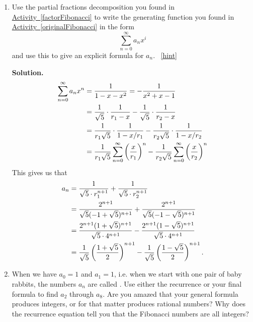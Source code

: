 \documentclass{book}
\begin{document}
\setcounter{project}{269}
\addtocounter{project}{-1}
\begin{activity}[]\label{solveFibonacci}
\leavevmode%
\begin{enumerate}[font=\bfseries,label=(\alph*),ref=\alph*]
\item\label{task-250} \hypertarget{p-1437}{}%
Use the partial fractions decomposition you found in \hyperref[factorFibonacci]{Activity~\ref{factorFibonacci}} to write the generating function you found in \hyperref[originalFibonacci]{Activity~\ref{originalFibonacci}} in the form%
\begin{equation*}
\sum_{n=0}^\infty a_nx^i
\end{equation*}
and use this to give an explicit formula for \(a_n\).%
~\hfill{\tiny\hyperlink{a-269.a}{[hint]}\hypertarget{q-269.a}{}}\par\smallskip%
\noindent\textbf{Solution.}\hypertarget{solution-206}{}\quad%
\hypertarget{p-1439}{}%
%
\begin{align*}
\sum_{n=0}^\infty a_nx^n  &= \frac{1}{1-x-x^2}= -\frac{1}{x^2+x-1}\\
&= \frac{1}{\sqrt{5}}\cdot\frac{1}{r_1-x} -\frac{1}{\sqrt{5}}\cdot\frac{1}{r_2-x}\\
&= \frac{1}{r_1\sqrt{5}}\cdot\frac{1}{1-x/r_1} -\frac{1}{r_2\sqrt{5}}\cdot\frac{1}{1-x/r_2}\\
&= \frac{1}{r_1\sqrt{5}}\sum_{n=0}^\infty\left(\frac{x}{r_1}\right)^n
-\frac{1}{r_2\sqrt{5}}\sum_{n=0}^\infty  \left(\frac{x}{r_2}\right)^n
\end{align*}
This gives us that%
\begin{align*}
a_n &= \frac{1}{\sqrt{5}\cdot r_1^{n+1}}
+\frac{1}{\sqrt{5}\cdot r_2^{n+1}}\\
&= \frac{2^{n+1}}{\sqrt{5}(-1+\sqrt{5})^{n+1}}
+
\frac{2^{n+1}}{\sqrt{5}(-1-\sqrt{5})^{n+1}}\\
&= \frac{2^{n+1}(1+\sqrt{5})^{n+1}}{\sqrt{5}\cdot
4^{n+1}}-
\frac{2^{n+1}(1-\sqrt{5})^{n+1}}{\sqrt{5}\cdot4^{n+1}}\\
&= \frac{1}{\sqrt{5}}\left(\frac{1+\sqrt{5}}{2}\right)^{n+1}-
\frac{1}{\sqrt{5}}\left(\frac{1-\sqrt{5}}{2}\right)^{n+1}.
\end{align*}
%
\item\label{task-251} \hypertarget{p-1440}{}%
When we have \(a_0=1\) and \(a_1=1\), i.e. when we start with one pair of baby rabbits, the numbers \(a_n\) are called .  Use either the recurrence or your final formula to find \(a_2\) through \(a_8\).  Are you amazed that your general formula produces integers, or for that matter produces rational numbers?  Why does the recurrence equation tell you that the Fibonacci numbers are all integers?%

\end{enumerate}
\end{activity}
\end{document}
